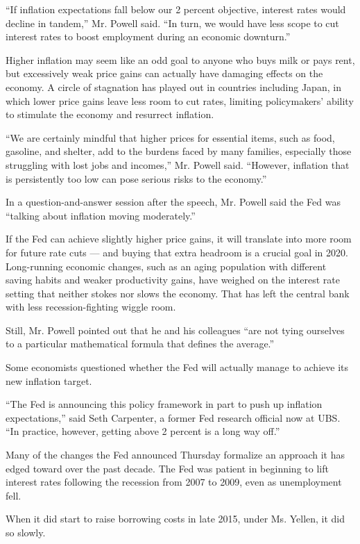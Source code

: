 ``If inflation expectations fall below our 2 percent objective, interest
rates would decline in tandem,'' Mr. Powell said. ``In turn, we would
have less scope to cut interest rates to boost employment during an
economic downturn.''

Higher inflation may seem like an odd goal to anyone who buys milk or
pays rent, but excessively weak price gains can actually have damaging
effects on the economy. A circle of stagnation has played out in
countries including Japan, in which lower price gains leave less room to
cut rates, limiting policymakers' ability to stimulate the economy and
resurrect inflation.

``We are certainly mindful that higher prices for essential items, such
as food, gasoline, and shelter, add to the burdens faced by many
families, especially those struggling with lost jobs and incomes,'' Mr.
Powell said. ``However, inflation that is persistently too low can pose
serious risks to the economy.''

In a question-and-answer session after the speech, Mr. Powell said the
Fed was ``talking about inflation moving moderately.''

If the Fed can achieve slightly higher price gains, it will translate
into more room for future rate cuts --- and buying that extra headroom
is a crucial goal in 2020. Long-running economic changes, such as an
aging population with different saving habits and weaker productivity
gains, have weighed on the interest rate setting that neither stokes nor
slows the economy. That has left the central bank with less
recession-fighting wiggle room.

Still, Mr. Powell pointed out that he and his colleagues ``are not tying
ourselves to a particular mathematical formula that defines the
average.''

Some economists questioned whether the Fed will actually manage to
achieve its new inflation target.

``The Fed is announcing this policy framework in part to push up
inflation expectations,'' said Seth Carpenter, a former Fed research
official now at UBS. ``In practice, however, getting above 2 percent is
a long way off.''

Many of the changes the Fed announced Thursday formalize an approach it
has edged toward over the past decade. The Fed was patient in beginning
to lift interest rates following the recession from 2007 to 2009, even
as unemployment fell.

When it did start to raise borrowing costs in late 2015, under Ms.
Yellen, it did so slowly.

